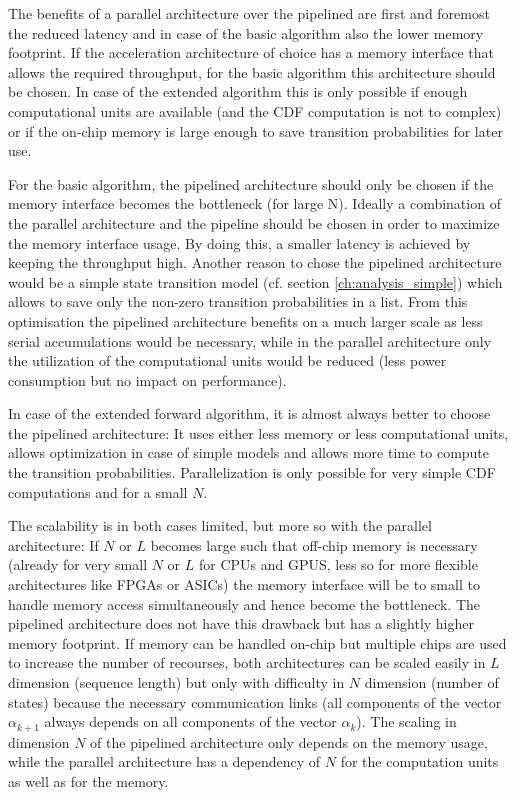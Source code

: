 \documentclass[mscthesis]{usiinfthesis}
\begin{document}
The benefits of a parallel architecture over the pipelined are first and
foremost the reduced latency and in case of the basic algorithm also the lower
memory footprint. If the acceleration architecture of choice has a memory
interface that allows the required throughput, for the basic algorithm this
architecture should be chosen. In case of the extended algorithm this is only
possible if enough computational units are available (and the CDF computation
is not to complex) or if the on-chip memory is large enough to save transition
probabilities for later use.

For the basic algorithm, the pipelined architecture should only be chosen if
the memory interface becomes the bottleneck (for large N). Ideally
a combination of the parallel architecture and the pipeline should be chosen in
order to maximize the memory interface usage. By doing this, a smaller latency
is achieved by keeping the throughput high. Another reason to chose the
pipelined architecture would be a simple state transition model (cf. section
\ref{ch:analysis_simple}) which allows to save only the non-zero transition
probabilities in a list. From this optimisation the pipelined architecture
benefits on a much larger scale as less serial accumulations would be
necessary, while in the parallel architecture only the utilization of the
computational units would be reduced (less power consumption but no impact on
performance).

In case of the extended forward algorithm, it is almost always better to choose
the pipelined architecture: It uses either less memory or less computational
units, allows optimization in case of simple models and allows more time to
compute the transition probabilities. Parallelization is only possible for very
simple CDF computations and for a small $N$.

The scalability is in both cases limited, but more so with the parallel
architecture: If $N$ or $L$ becomes large such that
off-chip memory is necessary (already for very small $N$ or $L$ for CPUs and
GPUS, less so for more flexible architectures like FPGAs or ASICs) the memory
interface will be to small to handle memory access simultaneously and hence
become the bottleneck. The pipelined architecture does not have this drawback
but has a slightly higher memory footprint. If memory can be handled on-chip but
multiple chips are used to increase the number of recourses, both
architectures can be scaled easily in $L$ dimension (sequence length) but only
with difficulty in $N$ dimension (number of states) because the necessary
communication links (all components of the vector $\alpha_{k+1}$ always depends
on all components of the vector $\alpha_k$). The scaling in dimension $N$ of the
pipelined architecture only depends on the memory usage, while the parallel
architecture has a dependency of $N$ for the computation units as well as for
the memory.
\end{document}
